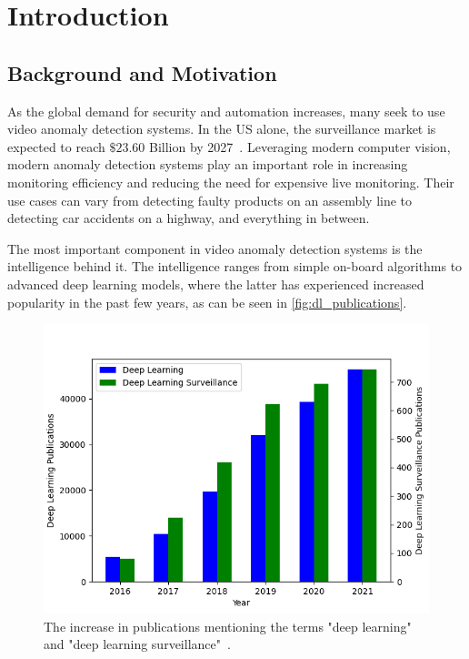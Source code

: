\chapter{Introduction}
\label{sec:introduction}
\section{Background and Motivation}
As the global demand for security and automation increases, many seek to use video anomaly detection systems. In the US alone, the surveillance market is expected to reach $\$23.60$ Billion by 2027~\cite{us_video_stats}. Leveraging modern computer vision, modern anomaly detection systems play an important role in increasing monitoring efficiency and reducing the need for expensive live monitoring. Their use cases can vary from detecting faulty products on an assembly line to detecting car accidents on a highway, and everything in between.
\par
The most important component in video anomaly detection systems is the intelligence behind it. The intelligence ranges from simple on-board algorithms to advanced deep learning models, where the latter has experienced increased popularity in the past few years, as can be seen in \autoref{fig:dl_publications}.\par
\begin{figure}[H]
    \centering
    \includegraphics[width=\linewidth]{resources/introduction/publications_graph}
    \caption[Publications Increase Comparison]{The increase in publications mentioning the terms "deep learning" and "deep learning surveillance"~\cite{deep_learning_surveillance_stats}.}
    \label{fig:dl_publications}
\end{figure}

